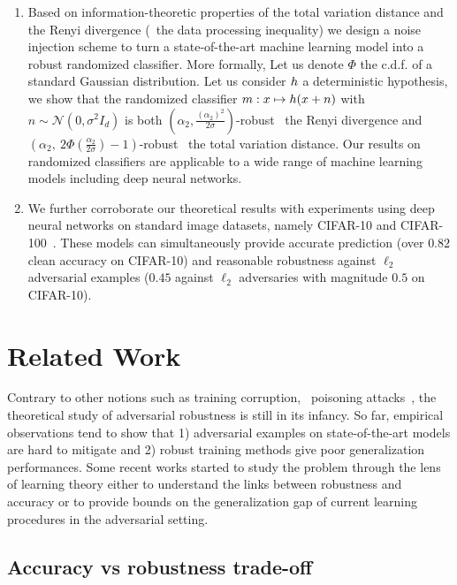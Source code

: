 \begin{enumerate}
    \item Based on information-theoretic properties of the total variation distance and the Renyi divergence (\eg~the data processing inequality) we design a noise injection scheme to turn a state-of-the-art machine learning model into a robust randomized classifier. More formally, Let us denote $\Phi$ the c.d.f. of a standard Gaussian distribution. Let us consider ${h}$ a deterministic hypothesis, we show that the randomized classifier $m : x  \mapsto \hypothesis\left(x +n\right)$ with $n\sim\mathcal{N}(0, \sigma^2 I_d)$ is both $(\alpha_2, \frac{(\alpha_2)^2}{2 \sigma})$-robust \wrt~the Renyi divergence and $(\alpha_2,\ 2 \Phi\left( \frac{\alpha_2}{2 \sigma} \right) - 1)$-robust \wrt~the total variation distance. Our results on randomized classifiers are applicable to a wide range of machine learning models including deep neural networks.
    
    \item We further corroborate our theoretical results with experiments using deep neural networks on standard image datasets, namely CIFAR-10 and CIFAR-100~\citep{krizhevsky2009learning}. These models can simultaneously provide accurate prediction (over $0.82$ clean accuracy on CIFAR-10) and reasonable robustness against $\ell_2$ adversarial examples ($0.45$ against $\ell_2$ adversaries with magnitude $0.5$ on CIFAR-10). 
\end{enumerate}


\section{Related Work}
\label{section::RW}


Contrary to other notions such as training corruption, \aka~poisoning attacks~\citep{kearns1993learning,kearns1994toward}, the theoretical study of adversarial robustness is still in its infancy. So far, empirical observations tend to show that 1) adversarial examples on state-of-the-art models are hard to mitigate and 2) robust training methods give poor generalization performances. Some recent works started to study the problem through the lens of learning theory either to understand the links between robustness and accuracy or to provide bounds on the generalization gap of current learning procedures in the adversarial setting.

\subsection{Accuracy vs robustness trade-off}
\label{sec:AccRobTradeoff}
 
